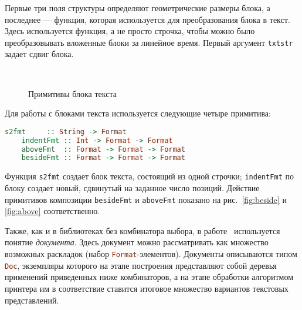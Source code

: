 Первые три поля структуры определяют геометрические размеры блока, а последнее --- функция,
которая используется для преобразования блока в текст. Здесь используется функция, а не
просто строчка, чтобы можно было преобразовывать вложенные блоки за линейное время. Первый
аргумент \lstinline[language = Haskell]{txtstr} задает сдвиг блока.

\begin{figure}
  \centering
  ~
  ~
  \caption{Примитивы блока текста}
  \label{fig:basicConcat}
\end{figure}

Для работы с блоками текста используется следующие четыре примитива:
\begin{lstlisting}[language=haskell]
    s2fmt     :: String -> Format
    indentFmt :: Int -> Format -> Format
    aboveFmt  :: Format -> Format -> Format
    besideFmt :: Format -> Format -> Format
\end{lstlisting}

Функция \lstinline[language = Haskell]{s2fmt} создает блок текста,
состоящий из одной строчки; \lstinline[language = Haskell]{indentFmt} по блоку создает новый,
сдвинутый на заданное число позиций. Действие примитивов композиции
\lstinline[language = Haskell]{besideFmt} и \lstinline[language = Haskell]{aboveFmt}
показано на рис.~\ref{fig:beside} и \ref{fig:above} соответственно.

Также, как и в библиотеках без комбинатора выбора, в работе~\cite{swierstra} используется понятие
\emph{документа}. Здесь документ можно рассматривать как множество возможных раскладок
(набор \lstinline[language = Haskell]{Format}-элементов). Документы описываются типом
\lstinline[language = Haskell]{Doc}, экземпляры которого на этапе построения представляют собой
деревья применений приведенных ниже комбинаторов, а на этапе обработки алгоритмом
принтера им в соответствие ставится итоговое множество вариантов текстовых представлений.

